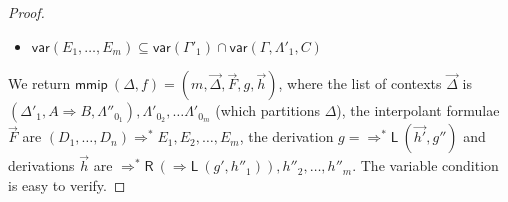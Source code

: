 \documentclass[a4paper,UKenglish,cleveref,autoref,thm-restate, anonymous]{lipics-v2021}
\renewcommand{\vec}[1]{\overrightarrow{#1}}
\newcommand{\Rarr}{\Rightarrow}
\newcommand{\Rs}{\Rightarrow^*}
\newcommand{\mf}[1]{\mathsf{#1}}
\newcommand{\vars}[1]{\mf{var} (#1)}
\newcommand{\GG}{\Gamma}
\newcommand{\GD}{\Delta}
\newcommand{\GL}{\Lambda}
\newcommand{\Rl}{{\Rarr}\mathsf{L}}
\newcommand{\Rsl}{{\Rs}\mathsf{L}}
\newcommand{\Rsr}{{\Rs}\mathsf{R}}
\begin{document}
\begin{proof}
\begin{itemize}
  \item $\vars{E_1 , \dots, E_m} \subseteq \vars{\GG'_1} \cap \vars{\GG,  \GL'_1 , C}$
  \end{itemize}
  We return $\mf{mmip}\ (\GD,f) = (m,\vec{\GD},\vec{F},g,\vec{h})$, where the list of contexts $\vec{\GD}$ is $(\GD'_1, A \Rarr B , \GL''_{0_1}), \GL'_{0_2}, \dots \GL'_{0_m}$ (which partitions $\GD$), the interpolant formulae  $\vec{F}$ are $(D_1,\dots,D_n) \Rs E_1 , E_2 , \dots , E_m$, the derivation $g = \Rsl \ (\vec{h'} , g'')$ and derivations $\vec{h}$ are $\Rsr \ (\Rl \ (g' , h''_1)), h''_2, \dots , h''_m$.
The variable condition is easy to verify.
\end{proof}
\end{document}
